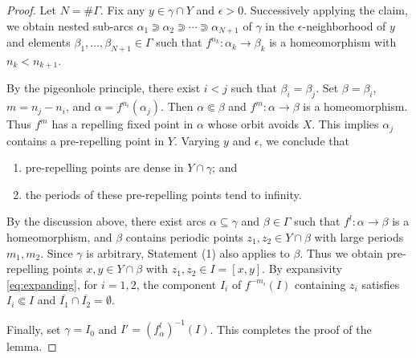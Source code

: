 \documentclass[a4paper,reqno,times, 11pt]{amsart}
\theoremstyle{remark}
\theoremstyle{plain}
\numberwithin{equation}{section}
\begin{document}
\begin{proof}
		Let $N = \#\Gamma$. Fix any $y \in \gamma \cap Y$ and $\epsilon > 0$. Successively applying the claim, we obtain nested sub-arcs $\alpha_1 \Supset \alpha_2 \Supset \cdots \Supset \alpha_{N+1}$ of $\gamma$ in the $\epsilon$-neighborhood of $y$ and elements $\beta_1, \ldots, \beta_{N+1} \in \Gamma$ such that $f^{n_k}: \alpha_k \to \beta_k$ is a homeomorphism with $n_k < n_{k+1}$.
		
		By the pigeonhole principle, there exist $i < j$ such that $\beta_i = \beta_j$. Set $\beta = \beta_i$, $m = n_j - n_i$, and $\alpha = f^{n_i}(\alpha_j)$. Then $\alpha \Subset \beta$ and $f^m: \alpha \to \beta$ is a homeomorphism. Thus $f^m$ has a repelling fixed point in $\alpha$ whose orbit avoids $X$. This implies $\alpha_j$ contains a pre-repelling point in $Y$. Varying $y$ and $\epsilon$, we conclude that
		\begin{enumerate}
			\item pre-repelling points are dense in $Y \cap \gamma$; and
			\item the periods of these pre-repelling points tend to infinity.
		\end{enumerate}
		
		By  the discussion above, there exist arcs $\alpha \subseteq \gamma$ and $\beta \in \Gamma$ such that $f^l: \alpha \to \beta$ is a homeomorphism, and $\beta$ contains periodic points $z_1, z_2 \in Y \cap \beta$ with large periods $m_1, m_2$. Since $\gamma$ is arbitrary, Statement (1) also applies to $\beta$. Thus we obtain pre-repelling points $x, y \in Y \cap \beta$ with $z_1, z_2 \in I = [x,y]$. By expansivity \eqref{eq:expanding}, for $i = 1, 2$, the component $I_i$ of $f^{-m_i}(I)$ containing $z_i$ satisfies $I_i \Subset I$ and $\overline{I_1} \cap \overline{I_2} = \emptyset$.
		
		Finally, set $\gamma = I_0$ and $I' = (f^l_\alpha)^{-1}(I)$. This completes the proof of the lemma.
	\end{proof}
	
	
	
\end{document}
